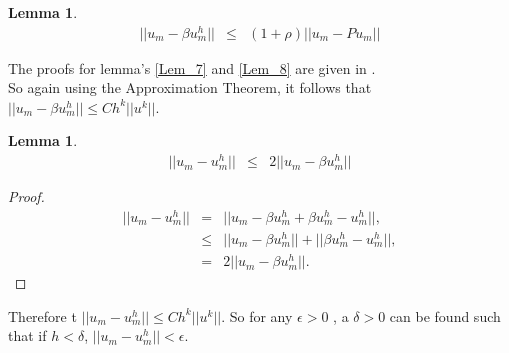 \documentclass[../../main.tex]{subfiles}
\begin{document}
\newtheorem{Lem_8}[Lem_1]{Lemma} \label{Lem_8}
\begin{Lem_8}
	\begin{eqnarray*}
		||u_{m} - \beta u_{m}^{h}|| &\leq & \left(1+\rho\right)||u_{m}-Pu_{m}||
	\end{eqnarray*}
\end{Lem_8}
\begin{comment}
\begin{proof}
	\begin{eqnarray*}
	||u_{m} - \beta u_{m}^{h}|| & \leq & ||u_{m}-Pu_{m}|| + ||Pu_{m} - \beta u_{m}^{h}|| \\
				& \leq & \left(1+\rho\right)||u_{m}-Pu_{m}|| \ \ \textrm{ (by Lemma \ref{Lem_7})}
	\end{eqnarray*}
\end{proof}
\end{comment}

The proofs for lemma's \ref{Lem_7} and \ref{Lem_8} are given in \cite{SF73}.\\

So again using the Approximation Theorem, it follows that $||u_{m} - \beta u_{m}^{h}||\leq Ch^{k}||u^{k}||$.\\


\newtheorem{Lem_9}[Lem_1]{Lemma} \label{Lem_9}
\begin{Lem_9}
	\begin{eqnarray*}
		||u_{m} -  u_{m}^{h}|| &\leq & 2||u_{m}-\beta u^{h}_{m}||
	\end{eqnarray*}
\end{Lem_9}
\begin{proof}
	\begin{eqnarray*}
	||u_{m} - u_{m}^{h}|| &=& ||u_{m} - \beta u_{m}^{h} + \beta u_{m}^{h} - u_{m}^{h}||, \\
						& \leq & ||u_{m} - \beta u_{m}^{h}|| + ||\beta u_{m}^{h} - u_{m}^{h}||, \\
						& = & 2||u_{m} - \beta u_{m}^{h}||.	
	\end{eqnarray*}
\end{proof}

Therefore t $||u_{m} -  u_{m}^{h}|| \leq Ch^{k}||u^{k}||$. So for any $\epsilon >0$ , a $\delta >0$ can be found such that if $h < \delta$, $||u_{m} -  u_{m}^{h}|| < \epsilon$.
\end{document}
